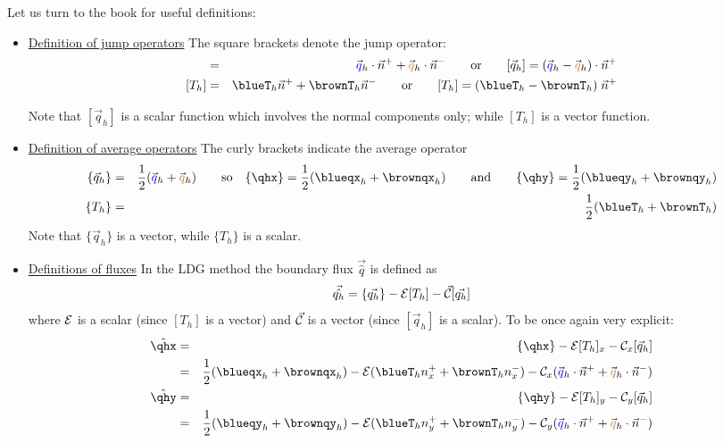 Let us turn to the book for useful definitions:
\begin{itemize}
\item
\underline{Definition of jump operators} The square brackets denote the jump operator:
\begin{eqnarray}
[\vec{q}_h] &=& \vec{\color{blue}q}_h \cdot \vec{n}^+ 
+ \vec{\color{brown} q}_h \cdot \vec{n}^- 
\qquad \text{or} \qquad 
[\vec{q}_h]= (\vec{\color{blue}q}_h - \vec{\color{brown}q}_h) \cdot \vec{n}^+    \nn\\
\left[T_h\right] &=& \blueT_h \vec{n}^+ + {\brownT}_h \vec{n}^-  \qquad \text{or} \qquad 
[T_h]=(\blueT_h  - \brownT_h ) \; \vec{n}^+ 
\end{eqnarray}

Note that $[\vec{q}_h]$ is a scalar function which involves the
normal components only; while $[T_h]$ is a vector function. 

\item
\underline{Definition of average operators} The curly brackets indicate the average operator
\begin{eqnarray}
\{ \vec{q}_h \}&=&\frac{1}{2}(\vec{\color{blue}q}_h + \vec{\color{brown}q}_h)
\qquad \text{so} \quad 
\{\qhx\}=\frac{1}{2}(\blueqx_h + \brownqx_h) 
\qquad \text{and}
\qquad  \{\qhy\}=\frac{1}{2}(\blueqy_h + \brownqy_h) \nn \\
\{T_h\}&=&\frac{1}{2}(\blueT_h + \brownT_h) \nn 
\end{eqnarray}
Note that $\{ \vec{q}_h \}$ is a vector, while 
$\{T_h\}$ is a scalar.

\item
\underline{Definitions of fluxes} In the LDG method the boundary flux $\vec{\hat{q}}$ is defined as 
\[
\vec{\hat{q_h}} = \{ \vec{q_h} \} -{\cal{E}} [T_h]- \vec{\cal{C}}  [\vec{q_h}] 
\]
where ${\cal{E}}$ is a scalar (since $[T_h]$ is a vector)
and $\vec{\cal C}$ is a vector (since $[\vec{q}_h]$ is a scalar).
To be once again very explicit:
\begin{eqnarray}
\hat{\qhx} 
&=& \{\qhx\} -{\cal{E}} [T_h]_x- {\cal{C}}_x  [\vec{q}_h] \nn\\
&=& \frac{1}{2}(\blueqx_h + \brownqx_h)
-{\cal{E}} (\blueT_h {n}_x^+ + \brownT_h {n}_x^-)
-{\cal{C}}_x  
(\vec{\color{blue}q}_h \cdot \vec{n}^+ +\vec{\color{brown}q}_h \cdot \vec{n}^-) \label{flux2Da}\\
\hat{\qhy} 
&=& \{\qhy\} -{\cal{E}} [T_h]_y- {\cal{C}}_y  [\vec{q}_h] \nn\\
&=& \frac{1}{2}(\blueqy_h + \brownqy_h)  
-{\cal{E}}  (\blueT_h {n}_y^+ + \brownT_h {n}_y^-)
-{\cal{C}}_y  (\vec{\color{blue} q}_h \cdot \vec{n}^+ +\vec{\color{brown}q}_h \cdot \vec{n}^-) \label{flux2Db}
\end{eqnarray}


\end{itemize}
